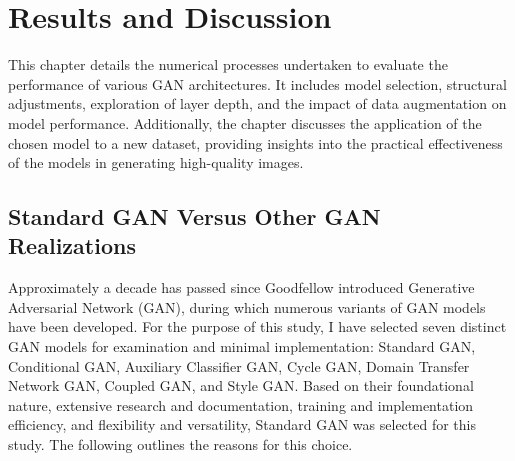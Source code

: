 \chapter{Results and Discussion}
\label{Experiments}

This chapter details the numerical processes undertaken to evaluate the performance of various GAN 
architectures. It includes model selection, structural adjustments, exploration of layer depth, and the 
impact of data augmentation on model performance. Additionally, the chapter discusses the application of 
the chosen model to a new dataset, providing insights into the practical effectiveness of the models 
in generating high-quality images. 


\section{Standard GAN Versus Other GAN Realizations}
Approximately a decade has passed since Goodfellow introduced Generative Adversarial Network (GAN), 
during which numerous variants of GAN models have been developed. For the purpose of this study, 
I have selected seven distinct GAN models for examination and minimal implementation: Standard GAN, 
Conditional GAN, Auxiliary Classifier GAN, Cycle GAN, Domain Transfer Network GAN, Coupled GAN, 
and Style GAN. Based on their foundational nature, extensive research and documentation, training and 
implementation efficiency, and flexibility and versatility, Standard GAN was selected for this study. 
The following outlines the reasons for this choice.


